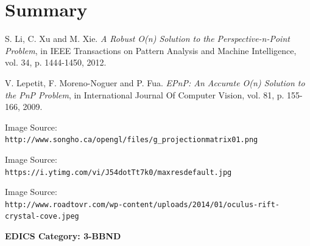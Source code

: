 \documentclass[journal]{IEEEtran}
\begin{document}
\section{Summary}


\begin{thebibliography}{10}
	
	S. Li, C. Xu and M. Xie. \textit{A Robust O(n) Solution to the Perspective-n-Point Problem}, in IEEE Transactions on Pattern Analysis and Machine Intelligence, vol. 34, p. 1444-1450, 2012.
	
	V. Lepetit, F. Moreno-Noguer and P. Fua. \textit{EPnP: An Accurate O(n) Solution to the PnP Problem}, in International Journal Of Computer Vision, vol. 81, p. 155-166, 2009.

	Image Source: \\\texttt{http://www.songho.ca/opengl/files/g\_projectionmatrix01.png}
	
	Image Source: \\\texttt{https://i.ytimg.com/vi/J54dotTt7k0/maxresdefault.jpg}
	
	
	Image Source: \\\texttt{http://www.roadtovr.com/wp-content/uploads/2014/01/oculus-rift-crystal-cove.jpeg}

\end{thebibliography}

 \ifCLASSOPTIONpeerreview
 \begin{center} \bfseries EDICS Category: 3-BBND \end{center}
 \fi



\IEEEpeerreviewmaketitle




   
\end{document}
